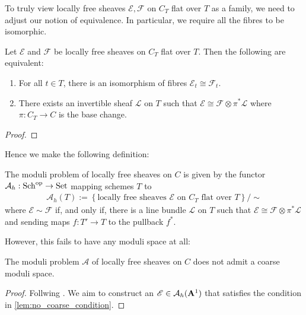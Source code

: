 \documentclass[12pt]{ociamthesis}  %
\begin{document}
To truly view locally free sheaves $\mathscr E,\mathscr F$ on
$C_T$ flat over $T$ as a family, we need to adjust our notion of
equivalence. In particular, we require all the fibres to be isomorphic.

\begin{lemma}
  Let $\mathscr E$ and $\mathscr F$ be locally free sheaves on $C_T$
  flat over $T$. Then the following are equivalent:
  \begin{enumerate}
    \item For all $t\in T$, there is an isomorphism of fibres
          $\mathscr E_t\cong\mathscr F_t$.
    \item There exists an invertible sheaf $\mathscr L$ on
          $T$ such that $\mathscr E \cong \mathscr F \otimes \pi^*\mathscr L$
          where $\pi : C_T \to C$ is the base change.
  \end{enumerate}
  \begin{proof}
    \missingproof
  \end{proof}
\end{lemma}

Hence we make the following definition:

\begin{definition}
  The moduli problem of locally free sheaves on $C$ is given by the
  functor $\mathcal A_h : \operatorname{Sch}^{\text{op}} \to \operatorname{Set}$
  mapping schemes $T$ to
  \begin{align*}
    \mathcal A_h(T) := \left\lbrace{\text{locally free sheaves $\mathscr E$ on $C_T$ flat over $T$}}\right\rbrace/\sim
  \end{align*}
  where $\mathscr E\sim\mathscr F$ if, and only if, there is a line bundle
  $\mathscr L$ on $T$ such that
  $\mathscr E \cong \mathscr F\otimes\pi^* \mathscr L$ and sending
  maps $f: T'\to T$ to the pullback $f^*$.
\end{definition}

However, this fails to have any moduli space at all:

\begin{lemma}\label{lem:no_coarse_moduli_space}
  The moduli problem $\mathcal A$ of locally free sheaves on $C$
  does not admit a coarse moduli space.
  \begin{proof}
    Follwing \cite[Example 2.2]{hoskins2016}. We aim to construct
    an $\mathscr E\in\mathcal A_h(\mathbf{A}^{1}_{})$ that satisfies the
    condition in \ref{lem:no_coarse_condition}.
    \missingproof
  \end{proof}
\end{lemma}
\end{document}
